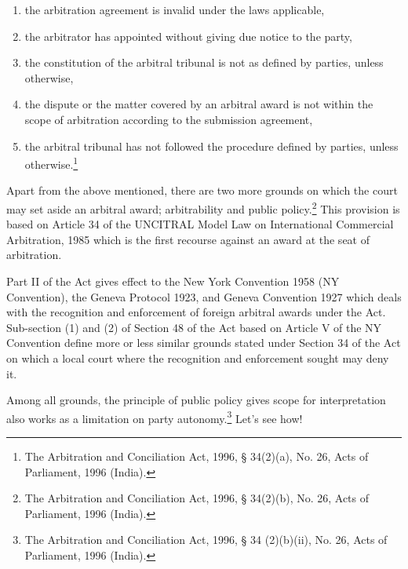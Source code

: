 \begin{multicols}{2}
\begin{enumerate}[label=$\alph*.$]
\item the arbitration agreement is invalid under the laws applicable,

\item the arbitrator has appointed without giving due notice to the party,

\item the constitution of the arbitral tribunal is not as defined by parties, unless otherwise,

\item the dispute or the matter covered by an arbitral award is not within the scope of arbitration according to the submission agreement,

\item the arbitral tribunal has not followed the procedure defined by parties, unless otherwise.\footnote{The Arbitration and Conciliation Act, 1996, § 34(2)(a), No. 26, Acts of Parliament, 1996 (India).}
\end{enumerate}

\vspace{-.3cm}

\noi
Apart from the above mentioned, there are two more grounds on which the court may set aside an arbitral award; arbitrability and public policy.\footnote{The Arbitration and Conciliation Act, 1996, § 34(2)(b), No. 26, Acts of Parliament, 1996 (India).} This provision is based on Article 34 of the UNCITRAL Model Law on International Commercial Arbitration, 1985 which is the first recourse against an award at the seat of arbitration.

\vspace{-.1cm}
\noi
Part II of the Act gives effect to the New York Convention 1958 (NY Convention), the Geneva
Protocol 1923, and Geneva Convention 1927 which deals with the recognition and
enforcement of foreign arbitral awards under the Act. Sub-section (1) and (2) of Section 48 of
the Act based on Article V of the NY Convention define more or less similar grounds stated
under Section 34 of the Act on which a local court where the recognition and enforcement
sought may deny it.

\vspace{-.1cm}

\noi
Among all grounds, the principle of public policy gives scope for interpretation also works as a limitation on party autonomy.\footnote{The Arbitration and Conciliation Act, 1996, § 34 (2)(b)(ii), No. 26, Acts of Parliament, 1996 (India).} Let’s see how!

\vspace{-.1cm}


\end{multicols}
